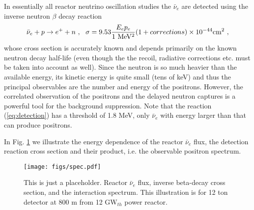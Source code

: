 In essentially all reactor neutrino oscillation studies the $\bar{\nu}_e$ are detected using the inverse neutron $\beta$ decay reaction
  \begin{equation}
  \bar{\nu}_e + p \rightarrow e^+ + n~, \\ ~~ \sigma = 9.53 \frac{E_e p_e}{ 1 ~ {\rm MeV^2}} (1 + corrections) \times 10^{-44} {\rm cm^2} ~,
  \label{eq:detection}
  \end{equation}
  whose cross section is accurately known \cite{VB99, Strumia} and depends primarily on the known neutron decay half-life (even though the the recoil, radiative
  corrections etc. must be taken into account as well). Since the neutron is so much heavier than the available energy, its kinetic energy is quite
  small (tens of keV) and thus the principal observables are the number and energy of the positrons. However, the correlated observation of the
  positrons and the delayed neutron captures is a powerful tool for the background suppression. Note that the reaction (\ref{eq:detection}) has
  a threshold of 1.8 MeV, only $\bar{\nu}_e$ with energy larger than that can produce positrons. 
  
  In Fig. \ref{fig:spectra} we illustrate the energy dependence of the reactor $\bar{\nu}_e$ flux, the detection reaction cross section and their product,
  i.e. the observable positron spectrum.
    

\begin{figure}[htb]
\begin{centering}
\texttt{[image: figs/spec.pdf]}
\par\end{centering}
\caption{\label{fig:spectra} This is just a placeholder. Reactor $\bar{\nu}_e$ flux, inverse beta-decay cross section,
and the interaction spectrum. This illustration is for  12 ton detector  at 800 m from 12 GW$_{th}$ power reactor. }
\end{figure}
